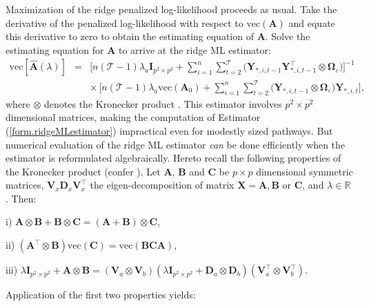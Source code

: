 Maximization of the ridge penalized log-likelihood proceeds as usual. Take the derivative of the penalized log-likelihood with respect to $\mbox{vec}(\mathbf{A})$ and equate this derivative to zero to obtain the estimating equation of $\mathbf{A}$. Solve the estimating equation for $\mathbf{A}$ to arrive at the ridge ML estimator:
\begin{eqnarray}
\nonumber
\mbox{vec}[ \hat{\mathbf{A}}(\lambda) ] & = &  \Big[ n (\mathcal{T} - 1) \lambda_a \mathbf{I}_{p^2 \times p^2}  + \sum_{i=1}^n \sum_{t=2}^{\mathcal{T}} \big( \mathbf{Y}_{\ast,i,t-1} \mathbf{Y}_{\ast,i,t-1}^{\top} \otimes \mathbf{\Omega}_{\varepsilon} \big) \Big]^{-1}
\\
\label{form.ridgeMLestimator}
& & \times \, \Big[n (\mathcal{T} - 1) \lambda_a \mbox{vec}(\mathbf{A}_0) + \sum_{i=1}^n \sum_{t=2}^{\mathcal{T}} \big( \mathbf{Y}_{\ast,i,t-1}  \otimes \mathbf{\Omega}_{\varepsilon} \big) \mathbf{Y}_{\ast,i,t} \Big],
\end{eqnarray}
where $\otimes$ denotes the Kronecker product \cite{Loan2000}. This estimator involves $p^2 \times p^2$ dimensional matrices, making 
the computation of Estimator (\ref{form.ridgeMLestimator}) impractical even for modestly sized pathways. But numerical evaluation of the ridge ML estimator \textit{can} be done efficiently when the estimator is reformulated algebraically. Hereto recall the following properties of the Kronecker product (confer \cite{Harville2008}). Let $\mathbf{A}$, $\mathbf{B}$ and $\mathbf{C}$ be $p \times p$ dimensional symmetric matrices, $\mathbf{V}_x \mathbf{D}_x \mathbf{V}_x^{\top}$ the eigen-decomposition of matrix $\mathbf{X} = \mathbf{A}, \mathbf{B}$ or $\mathbf{C}$, and $\lambda \in \mathbb{R}$. Then:
\begin{compactitem}
\item[i)] $\mathbf{A} \otimes \mathbf{B} + \mathbf{B} \otimes \mathbf{C}  = (\mathbf{A} + \mathbf{B}) \otimes \mathbf{C}$,

\item[ii)] $(\mathbf{A}^{\top} \otimes \mathbf{B}) \mbox{vec}(\mathbf{C}) = \mbox{vec} (\mathbf{B} \mathbf{C} \mathbf{A})$,

\item[iii)] $\lambda \mathbf{I}_{p^2 \times p^2 } + \mathbf{A} \otimes \mathbf{B} =
(\mathbf{V}_a \otimes \mathbf{V}_{b}) (\lambda \mathbf{I}_{p^2 \times p^2}  +  \mathbf{D}_a \otimes \mathbf{D}_{b}) (\mathbf{V}_a^{\top} \otimes \mathbf{V}_{b}^{\top})$.
\end{compactitem}
Application of the first two properties yields:
